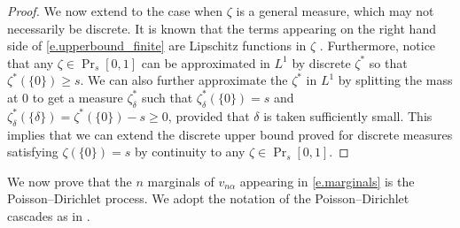 \documentclass[11pt]{amsart}
\theoremstyle{remark}
\theoremstyle{definition}
\numberwithin{equation}{section}
\numberwithin{proposition}{section}
\numberwithin{figure}{section}
\numberwithin{table}{section}
\renewcommand{\geq}{\geqslant}
\newcommand{\1}{\mathbf{1}}
\begin{document}
\begin{proof}
We now extend to the case when $\zeta$ is a general measure, which may not necessarily be discrete. It is known that the terms appearing on the right hand side of \eqref{e.upperbound_finite} are Lipschitz functions in $\zeta$ \cite[Bonus Chapter Lemma~A.6]{pan}. Furthermore, notice that any $\zeta \in \Pr_s[0,1]$ can be approximated in $L^1$ by discrete $\zeta^*$ so that $\zeta^*(\{0 \}) \geq s$. We can also further approximate the $\zeta^*$ in $L^1$ by splitting the mass at $0$ to get a measure $\zeta^*_\delta$ such that $\zeta^*_\delta( \{ 0\}) = s$ and $\zeta^*_\delta( \{ \delta \} ) = \zeta^*( \{ 0 \} ) - s \geq 0$, provided that $\delta$ is taken sufficiently small. This implies that we can extend the discrete upper bound proved for discrete measures satisfying $\zeta( \{ 0\}) = s$ by continuity to any $\zeta \in \Pr_s[0,1]$. 
\end{proof}

We now prove that the $n$ marginals of $v_{n \alpha}$ appearing in \eqref{e.marginals} is the Poisson--Dirichlet process. We adopt the notation of the Poisson--Dirichlet cascades as in \cite[Chapter~2]{pan}. 
\end{document}
